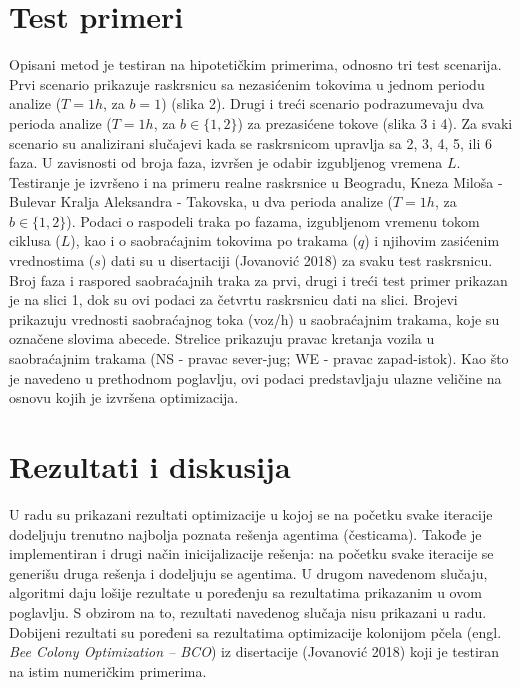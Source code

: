 \section{Test primeri}

Opisani metod je testiran na hipotetičkim primerima, odnosno tri test scenarija. Prvi scenario prikazuje raskrsnicu sa nezasićenim tokovima u jednom periodu analize ($T=1h$, za $b = 1$) (slika 2). Drugi i treći scenario podrazumevaju dva perioda analize ($T=1h$, za $b\in\{1,2\}$) za prezasićene tokove (slika 3 i 4). Za svaki scenario su analizirani slučajevi kada se raskrsnicom upravlja sa 2, 3, 4, 5, ili 6 faza. U zavisnosti od broja faza, izvršen je odabir izgubljenog vremena $L$. Testiranje je izvršeno i na primeru realne raskrsnice u Beogradu, Kneza Miloša - Bulevar Kralja Aleksandra - Takovska, u dva perioda analize  ($T=1h$, za $b\in\{1,2\}$). Podaci o raspodeli traka po fazama, izgubljenom vremenu tokom ciklusa ($L$), kao i o saobraćajnim tokovima po trakama ($q$) i njihovim zasićenim vrednostima ($s$) dati su u disertaciji (Jovanović 2018) za svaku test raskrsnicu. Broj faza i raspored saobraćajnih traka za prvi, drugi i treći test primer prikazan je na slici 1, dok su ovi podaci za četvrtu raskrsnicu dati na slici. Brojevi prikazuju vrednosti saobraćajnog toka (voz/h) u saobraćajnim trakama, koje su označene slovima abecede. Strelice prikazuju pravac kretanja vozila u saobraćajnim trakama (NS - pravac sever-jug; WE - pravac zapad-istok). Kao što je navedeno u prethodnom poglavlju, ovi podaci predstavljaju ulazne veličine na osnovu kojih je izvršena optimizacija.







\section{Rezultati i diskusija}

U radu su prikazani rezultati optimizacije u kojoj se na početku svake iteracije dodeljuju trenutno najbolja poznata rešenja agentima (česticama). Takođe je implementiran i drugi način inicijalizacije rešenja: na početku svake iteracije se generišu druga rešenja i dodeljuju se agentima. U drugom navedenom slučaju, algoritmi daju lošije rezultate u poređenju sa rezultatima prikazanim u ovom poglavlju. S obzirom na to, rezultati navedenog slučaja nisu prikazani u radu. Dobijeni rezultati su poređeni sa rezultatima optimizacije kolonijom pčela (engl. \emph{Bee Colony Optimization – BCO}) iz disertacije (Jovanović 2018) koji je testiran na istim numeričkim primerima.

